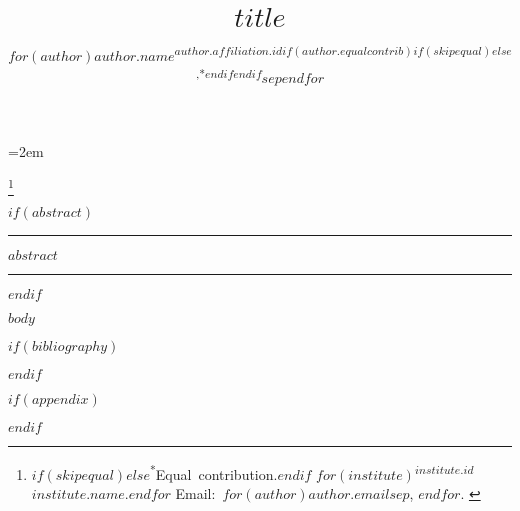 \documentclass[letterpaper,twocolumn,10pt]{article}
\title{$title$}
\author{$for(author)$\mbox{$author.name$\textsuperscript{$author.affiliation.id$$if(author.equalcontrib)$$if(skipequal)$$else$,*$endif$$endif$}}$sep$\quad $endfor$}
\date{}
\newcommand\blfootnote[1]{%
  \begingroup
  \renewcommand\thefootnote{}\footnote{\raggedright\hspace{-2em} #1}%
  \addtocounter{footnote}{-1}%
  \endgroup
}
\begin{document}
\frenchspacing

\maketitle

\thispagestyle{fancy}
\parindent=2em
\setnowidow[2]

\blfootnote{%
  {%
    \normalfont\sffamily\scriptsize%
    $if(skipequal)$$else$\mbox{\textsuperscript{*}Equal contribution.}\enskip$endif$%
    $for(institute)$\mbox{\textsuperscript{$institute.id$}$institute.name$.}\enskip$endfor$%
    Email:~$for(author)$\mbox{\texttt{$author.email$}}$sep$, $endfor$.%
  }%
}

$if(abstract)$
\hrule height 1pt
\vspace{1ex}%
{\parindent=0pt \normalfont\sffamily\small $abstract$}
\vspace{1ex}%
\hrule height 1pt
\vspace{1ex}
$endif$

$body$

$if(bibliography)$
\footnotesize


\normalsize
$endif$

$if(appendix)$
\renewcommand\thefigure{S\arabic{figure}}
\renewcommand\thetable{S\arabic{table}}
\setcounter{figure}{0}
\setcounter{table}{0}
\clearpage
\appendix

$endif$
\end{document}
